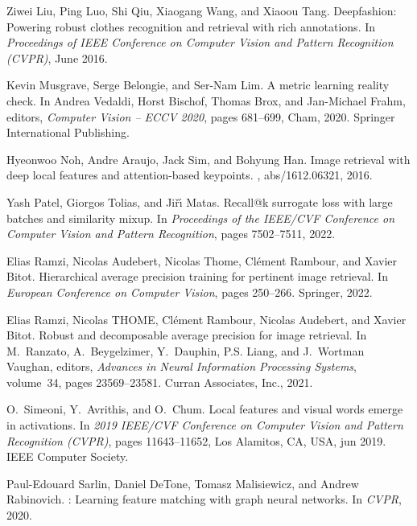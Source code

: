 \documentclass{article}
\begin{document}
\begin{thebibliography}{YCYW19}
Ziwei Liu, Ping Luo, Shi Qiu, Xiaogang Wang, and Xiaoou Tang.
\newblock Deepfashion: Powering robust clothes recognition and retrieval with
  rich annotations.
\newblock In {\em Proceedings of IEEE Conference on Computer Vision and Pattern
  Recognition (CVPR)}, June 2016.

Kevin Musgrave, Serge Belongie, and Ser-Nam Lim.
\newblock A metric learning reality check.
\newblock In Andrea Vedaldi, Horst Bischof, Thomas Brox, and Jan-Michael Frahm,
  editors, {\em Computer Vision -- ECCV 2020}, pages 681--699, Cham, 2020.
  Springer International Publishing.

Hyeonwoo Noh, Andre Araujo, Jack Sim, and Bohyung Han.
\newblock Image retrieval with deep local features and attention-based
  keypoints.
, abs/1612.06321, 2016.

Yash Patel, Giorgos Tolias, and Ji{\v{r}}{\'\i} Matas.
\newblock Recall@k surrogate loss with large batches and similarity mixup.
\newblock In {\em Proceedings of the IEEE/CVF Conference on Computer Vision and
  Pattern Recognition}, pages 7502--7511, 2022.

Elias Ramzi, Nicolas Audebert, Nicolas Thome, Cl{\'e}ment Rambour, and Xavier
  Bitot.
\newblock Hierarchical average precision training for pertinent image
  retrieval.
\newblock In {\em European Conference on Computer Vision}, pages 250--266.
  Springer, 2022.

Elias Ramzi, Nicolas THOME, Cl\'{e}ment Rambour, Nicolas Audebert, and Xavier
  Bitot.
\newblock Robust and decomposable average precision for image retrieval.
\newblock In M.~Ranzato, A.~Beygelzimer, Y.~Dauphin, P.S. Liang, and J.~Wortman
  Vaughan, editors, {\em Advances in Neural Information Processing Systems},
  volume~34, pages 23569--23581. Curran Associates, Inc., 2021.

O.~Simeoni, Y.~Avrithis, and O.~Chum.
\newblock Local features and visual words emerge in activations.
\newblock In {\em 2019 IEEE/CVF Conference on Computer Vision and Pattern
  Recognition (CVPR)}, pages 11643--11652, Los Alamitos, CA, USA, jun 2019.
  IEEE Computer Society.

Paul-Edouard Sarlin, Daniel DeTone, Tomasz Malisiewicz, and Andrew Rabinovich.
: Learning feature matching with graph neural networks.
\newblock In {\em CVPR}, 2020.


\end{thebibliography}
\end{document}
